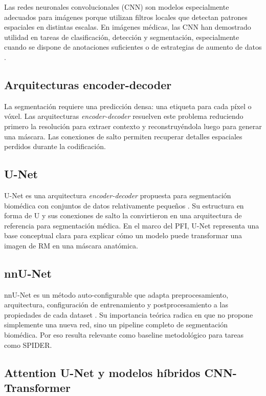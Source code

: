 Las redes neuronales convolucionales (CNN) son modelos especialmente adecuados para imágenes porque utilizan filtros locales que detectan patrones espaciales en distintas escalas. En imágenes médicas, las CNN han demostrado utilidad en tareas de clasificación, detección y segmentación, especialmente cuando se dispone de anotaciones suficientes o de estrategias de aumento de datos \parencite{lecun_deep_learning_2015,litjens_survey_2017}.

\subsection{Arquitecturas encoder-decoder}

La segmentación requiere una predicción densa: una etiqueta para cada píxel o vóxel. Las arquitecturas \textit{encoder-decoder} resuelven este problema reduciendo primero la resolución para extraer contexto y reconstruyéndola luego para generar una máscara. Las conexiones de salto permiten recuperar detalles espaciales perdidos durante la codificación.

\subsection{U-Net}

U-Net es una arquitectura \textit{encoder-decoder} propuesta para segmentación biomédica con conjuntos de datos relativamente pequeños \parencite{ronneberger_unet_2015}. Su estructura en forma de U y sus conexiones de salto la convirtieron en una arquitectura de referencia para segmentación médica. En el marco del PFI, U-Net representa una base conceptual clara para explicar cómo un modelo puede transformar una imagen de RM en una máscara anatómica.

\subsection{nnU-Net}

nnU-Net es un método auto-configurable que adapta preprocesamiento, arquitectura, configuración de entrenamiento y postprocesamiento a las propiedades de cada dataset \parencite{isensee_nnunet_2021}. Su importancia teórica radica en que no propone simplemente una nueva red, sino un pipeline completo de segmentación biomédica. Por eso resulta relevante como baseline metodológico para tareas como SPIDER.

\subsection{Attention U-Net y modelos híbridos CNN-Transformer}

